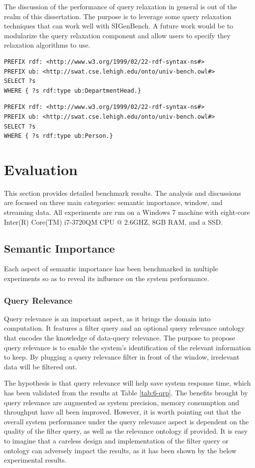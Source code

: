 The discussion of the performance of query relaxation in general is out of the realm of this dissertation. 
The purpose is to leverage some query relaxation techniques that can work well with SIGenBench. 
A future work would be to modularize the query relaxation component and allow users to specify they relaxation algorithms to use.

\begin{lstlisting}[language=SPARQL, caption={Relaxed Query 1},basicstyle=\small,frame=single]
PREFIX rdf: <http://www.w3.org/1999/02/22-rdf-syntax-ns#>
PREFIX ub: <http://swat.cse.lehigh.edu/onto/univ-bench.owl#>
SELECT ?s
WHERE {	?s rdf:type ub:DepartmentHead.}
\end{lstlisting}

\begin{lstlisting}[language=SPARQL, caption={Relaxed Query 2},basicstyle=\small,frame=single]
PREFIX rdf: <http://www.w3.org/1999/02/22-rdf-syntax-ns#>
PREFIX ub: <http://swat.cse.lehigh.edu/onto/univ-bench.owl#>
SELECT ?s
WHERE {	?s rdf:type ub:Person.}
\end{lstlisting}
%
\section{Evaluation}
This section provides detailed benchmark results.
The analysis and discussions are focused on three main categories: semantic importance, window, and streaming data.
All experiments are run on a Windows 7 machine with eight-core Inter(R) Core(TM) i7-3720QM CPU @ 2.6GHZ, 8GB RAM, and a SSD. 
%
\subsection{Semantic Importance}
Each aspect of semantic importance has been benchmarked in multiple experiments so as to reveal its influence on the system performance. 
%
\subsubsection{Query Relevance}
Query relevance is an important aspect, as it brings the domain into computation.
It features a filter query and an optional query relevance ontology that encodes the knowledge of data-query relevance.
The purpose to propose query relevance is to enable the system's identification of the relevant information to keep. 
By plugging a query relevance filter in front of the window, irrelevant data will be filtered out.

The hypothesis is that query relevance will help save system response time, which has been validated from the results at Table \ref{tab:6-qrp}. 
The benefits brought by query relevance are augmented as system precision, memory consumption and throughput have all been improved. 
However, it is worth pointing out that the overall system performance under the query relevance aspect is dependent on the quality of the filter query, as well as the relevance ontology if provided. 
It is easy to imagine that a careless design and implementation of the filter query or ontology can adversely impact the results, as it has been shown by the below experimental results.

